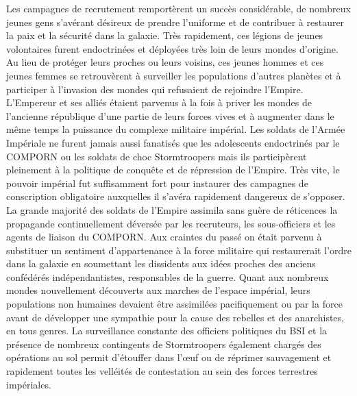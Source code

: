 \documentclass[twoside]{article}
\begin{document}
Les campagnes de recrutement remportèrent un succès considérable, de nombreux jeunes gens s'avérant désireux de prendre l'uniforme et de contribuer à restaurer la paix et la sécurité dans la galaxie. Très rapidement, ces légions de jeunes volontaires furent endoctrinées et déployées très loin de leurs mondes d'origine. Au lieu de protéger leurs proches ou leurs voisins, ces jeunes hommes et ces jeunes femmes se retrouvèrent à surveiller les populations d'autres planètes et à participer à l'invasion des mondes qui refusaient de rejoindre l'Empire. L'Empereur et ses alliés étaient parvenus à la fois à priver les mondes de l'ancienne république d'une partie de leurs forces vives et à augmenter dans le même temps la puissance du complexe militaire impérial. Les soldats de l'Armée Impériale ne furent jamais aussi fanatisés que les adolescents endoctrinés par le COMPORN ou les soldats de choc Stormtroopers mais ils participèrent pleinement à la politique de conquête et de répression de l'Empire. Très vite, le pouvoir impérial fut suffisamment fort pour instaurer des campagnes de conscription obligatoire auxquelles il s'avéra rapidement dangereux de s'opposer.\\

La grande majorité des soldats de l'Empire assimila sans guère de réticences la propagande continuellement déversée par les recruteurs, les sous-officiers et les agents de liaison du COMPORN. Aux craintes du passé on était parvenu à substituer un sentiment d'appartenance à la force militaire qui restaurerait l'ordre dans la galaxie en soumettant les dissidents aux idées proches des anciens confédérés indépendantistes, responsables de la guerre. Quant aux nombreux mondes nouvellement découverts aux marches de l'espace impérial, leurs populations non humaines devaient être assimilées pacifiquement ou par la force avant de développer une sympathie pour la cause des rebelles et des anarchistes, en tous genres. La surveillance constante des officiers politiques du BSI et la présence de nombreux contingents de Stormtroopers également chargés des opérations au sol permit d'étouffer dans l'\oe uf ou de réprimer sauvagement et rapidement toutes les velléités de contestation au sein des forces terrestres impériales.\\
\end{document}
